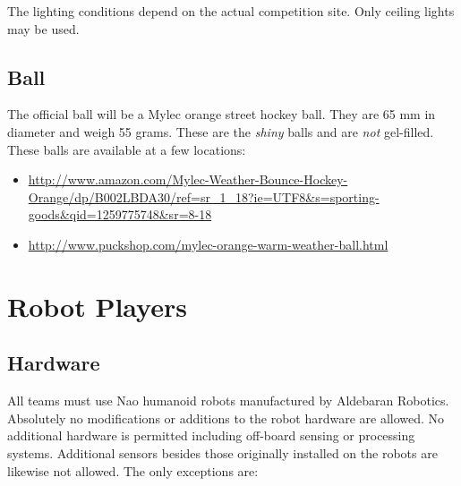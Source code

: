 \documentclass[12pt]{article}
\begin{document}
The lighting conditions depend on the actual competition site. Only ceiling lights may be used.

\subsection{Ball}
\label{sec:ball}

The official ball will be a Mylec orange street hockey ball. They are 65 mm in diameter and weigh 55 grams. These are the \emph{shiny} balls and are \emph{not} gel-filled. These balls are available at a few locations:
\begin{itemize}
\item \href{http://www.amazon.com/Mylec-Weather-Bounce-Hockey-Orange/dp/B002LBDA30/ref=sr\_1\_18?ie=UTF8\&s=sporting-goods\&qid=1259775748\&sr=8-18}{http://www.amazon.com/Mylec-Weather-Bounce-Hockey-Orange/dp/B002LBDA30/ref=sr\_1\_18?ie=UTF8\&s=sporting-goods\&qid=1259775748\&sr=8-18}
\item \href{http://www.puckshop.com/mylec-orange-warm-weather-ball.html}{http://www.puckshop.com/mylec-orange-warm-weather-ball.html}
\end{itemize}


\section{Robot Players}

\subsection{Hardware}

All teams must use Nao humanoid robots manufactured by Aldebaran Robotics. Absolutely no modifications or additions to the robot hardware are allowed. No additional hardware is permitted including off-board sensing or processing systems. Additional sensors besides those originally installed on the robots are likewise not allowed. The only exceptions are:
\end{document}
